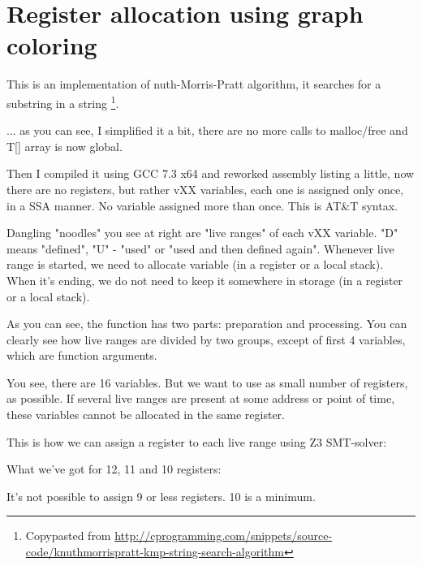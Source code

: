 \section{Register allocation using graph coloring}

\renewcommand{\CURPATH}{color/reg_alloc}

This is an implementation of nuth-Morris-Pratt algorithm, it searches for a substring in a string
\footnote{Copypasted from \url{http://cprogramming.com/snippets/source-code/knuthmorrispratt-kmp-string-search-algorithm}}.



... as you can see, I simplified it a bit, there are no more calls to malloc/free and T[] array is now global.

Then I compiled it using GCC 7.3 x64 and reworked assembly listing a little, now there are no registers, but rather vXX variables, each one is assigned only once,
in a \ac{SSA} manner. No variable assigned more than once. This is AT\&T syntax.

%


Dangling "noodles" you see at right are "live ranges" of each vXX variable. "D" means "defined", "U" - "used" or "used and then defined again".
Whenever live range is started, we need to allocate variable (in a register or a local stack).
When it's ending, we do not need to keep it somewhere in storage (in a register or a local stack).

As you can see, the function has two parts: preparation and processing.
You can clearly see how live ranges are divided by two groups, except of first 4 variables, which are function arguments.

You see, there are 16 variables. But we want to use as small number of registers, as possible.
If several live ranges are present at some address or point of time, these variables cannot be allocated in the same register.

This is how we can assign a register to each live range using Z3 SMT-solver:



What we've got for 12, 11 and 10 registers:



It's not possible to assign 9 or less registers. 10 is a minimum.

